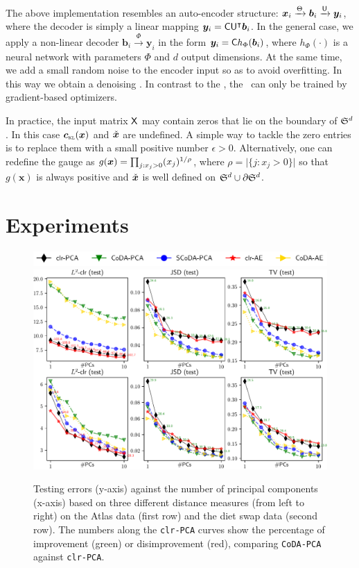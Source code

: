 \documentclass{article}
\begin{document}
The above implementation resembles an auto-encoder structure:
$\bm{x}_i\xrightarrow{\Theta}\bm{b}_i\xrightarrow{\mathsf{U}}\bm{y}_i$,
where the decoder is simply a linear mapping $\bm{y}_i=\mathsf{C}\mathsf{U}^\intercal\bm{b}_i$.
In the general case, we apply a non-linear decoder
$\bm{b}_i\xrightarrow{\Phi}\bm{y}_i$
in the form $\bm{y}_i=\mathsf{C} h_{\Phi}(\bm{b}_i)$,
where $h_{\Phi}(\cdot)$ is a neural network with parameters $\Phi$ and $d$ output dimensions.
At the same time, we add a small random noise to the encoder input so as to avoid overfitting.
In this way we obtain a denoising \CoDAAE.
In contrast to the \CoDAPCA, the \CoDAAE~can only be trained by gradient-based optimizers.

In practice, the input matrix $\mathsf{X}$ may contain zeros that lie on the boundary of $\mathfrak{S}^d$.
In this case $\clrlog(\ve{x})$ and $\check{\bm{x}}$ are undefined.
A simple way to tackle the zero entries is to replace them with a small positive number
$\epsilon>0$.  Alternatively, one can redefine the gauge as
$g(\bm{x})=\prod_{j:x_j>0} (x_j)^{1/\rho}$, where $\rho=\vert\{j:x_j>0\}\vert$
so that $g(\bm{x})$ is always positive and $\check{\bm{x}}$ is well defined on
$\mathfrak{S}^d\cup\partial\mathfrak{S}^d$.

\section{Experiments}

\begin{figure}[!t]
\centering
\includegraphics[width=.8\textwidth]{legend}\\%
\includegraphics[width=\textwidth]{curves}%
\caption{Testing errors (y-axis) against the number of principal components
(x-axis) based on three different distance measures (from left to right)
on the Atlas data (first row) and the diet swap data (second row).
The numbers along the \texttt{clr-PCA} curves show the percentage of
improvement (green) or disimprovement (red), comparing \texttt{CoDA-PCA} against \texttt{clr-PCA}.\label{fig:result}}
\end{figure}
\end{document}
